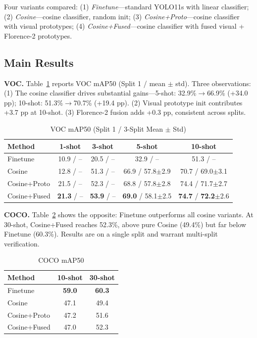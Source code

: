 \documentclass[conference]{IEEEtran}
\begin{document}
Four variants compared: (1) \textit{Finetune}---standard YOLO11s with linear classifier; (2) \textit{Cosine}---cosine classifier, random init; (3) \textit{Cosine+Proto}---cosine classifier with visual prototypes; (4) \textit{Cosine+Fused}---cosine classifier with fused visual + Florence-2 prototypes.

\subsection{Main Results}

\textbf{VOC.} Table~\ref{tab:voc_main} reports VOC mAP50 (Split 1 / mean $\pm$ std). Three observations: (1) The cosine classifier drives substantial gains---5-shot: 32.9\%$\rightarrow$66.9\% (+34.0 pp); 10-shot: 51.3\%$\rightarrow$70.7\% (+19.4 pp). (2) Visual prototype init contributes +3.7 pp at 10-shot. (3) Florence-2 fusion adds +0.3 pp, consistent across splits.

\begin{table}[t]
\centering\footnotesize
\caption{VOC mAP50 (Split 1 / 3-Split Mean $\pm$ Std)}
\label{tab:voc_main}
\begin{tabular}{lcccc}
\toprule
Method & 1-shot & 3-shot & 5-shot & 10-shot \\
\midrule
Finetune      & 10.9 / --   & 20.5 / --    & 32.9 / --    & 51.3 / --     \\
Cosine        & 12.8 / --   & 51.3 / --    & 66.9 / 57.8$\pm$2.9 & 70.7 / 69.0$\pm$3.1 \\
Cosine+Proto  & 21.5 / --   & 52.3 / --    & 68.8 / 57.8$\pm$2.8 & 74.4 / 71.7$\pm$2.7 \\
Cosine+Fused  & \textbf{21.3} / -- & \textbf{53.9} / -- & \textbf{69.0} / 58.1$\pm$2.5 & \textbf{74.7} / \textbf{72.2}$\pm$2.6 \\
\bottomrule
\end{tabular}
\end{table}

\textbf{COCO.} Table~\ref{tab:coco_main} shows the opposite: Finetune outperforms all cosine variants. At 30-shot, Cosine+Fused reaches 52.3\%, above pure Cosine (49.4\%) but far below Finetune (60.3\%). Results are on a single split and warrant multi-split verification.

\begin{table}[ht]
\centering
\caption{COCO mAP50}
\label{tab:coco_main}
\begin{tabular}{lcc}
\toprule
Method & 10-shot & 30-shot \\
\midrule
Finetune      & \textbf{59.0} & \textbf{60.3} \\
Cosine        & 47.1 & 49.4 \\
Cosine+Proto  & 47.2 & 51.6 \\
Cosine+Fused  & 47.0 & 52.3 \\
\bottomrule
\end{tabular}
\end{table}
\end{document}
